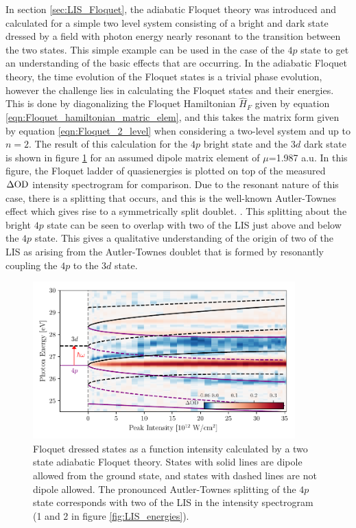 In section \ref{sec:LIS_Floquet}, the adiabatic Floquet theory was introduced and calculated for a simple two level system consisting of a bright and dark state dressed by a field with photon energy nearly resonant to the transition between the two states.  This simple example can be used in the case of the $4p$ state to get an understanding of the basic effects that are occurring.  In the adiabatic Floquet theory, the time evolution of the Floquet states is a trivial phase evolution, however the challenge lies in calculating the Floquet states and their energies.  This is done by diagonalizing the Floquet Hamiltonian $\hat{H}_F$ given by equation \ref{eqn:Floquet_hamiltonian_matric_elem}, and this takes the matrix form given by equation \ref{eqn:Floquet_2_level} when considering a two-level system and up to $n=2$.  The result of this calculation for the $4p$ bright state and the $3d$ dark state is shown in figure \ref{fig:2_state_floquet} for an assumed dipole matrix element of $\mu$=1.987 a.u.  In this figure, the Floquet ladder of quasienergies is plotted on top of the measured $\dod$ intensity spectrogram for comparison.  Due to the resonant nature of this case, there is a splitting that occurs, and this is the well-known Autler-Townes effect which gives rise to a symmetrically split doublet. \cite{wuTheoryStrongfieldAttosecond2016, beckAttosecondTransientAbsorption2014, wuTimedomainPerspectiveAutlerTownes2013}.  This splitting about the bright $4p$ state can be seen to overlap with two of the LIS just above and below the $4p$ state.  This gives a qualitative understanding of the origin of two of the LIS as arising from the Autler-Townes doublet that is formed by resonantly coupling the $4p$ to the $3d$ state.

\begin{figure}
	\centering
	\includegraphics[width=0.9\textwidth]{figures/ATS/2_state_LIS.pdf}
	\caption[Two state Floquet theory compared to measured $\dod$]{Floquet dressed states as a function intensity calculated by a two state adiabatic Floquet theory.  States with solid lines are dipole allowed from the ground state, and states with dashed lines are not dipole allowed.  The pronounced Autler-Townes splitting of the $4p$ state corresponds with two of the LIS in the intensity spectrogram (1 and 2 in figure \ref{fig:LIS_energies}).}
	\label{fig:2_state_floquet}
\end{figure}

